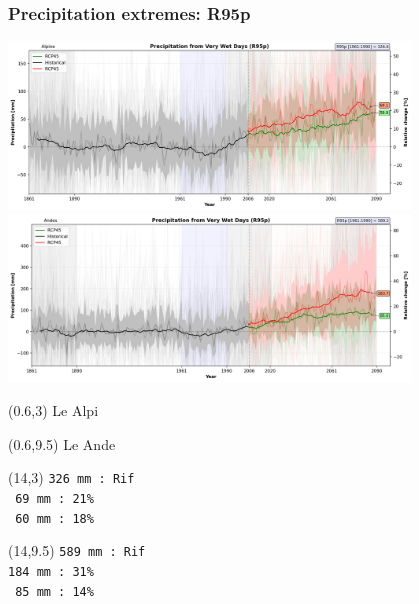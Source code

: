 
\begin{frame}
\frametitle{Precipitation extremes: R95p}
\begin{center}

{\includegraphics[width=0.8\textwidth]{risultati/r95p_Alpine_Models_ts}}
{\includegraphics[width=0.8\textwidth]{risultati/r95p_Andes_Models_ts}}
\end{center}

{
  \scriptsize
  \begin{textblock}{1.8}(0.6,3)
     {\color{gray} Le Alpi}
  \end{textblock}
}


{
  \scriptsize
  \begin{textblock}{1.8}(0.6,9.5)
     {\color{gray} Le Ande}
  \end{textblock}
}

{ \tiny
  \begin{textblock}{3}(14,3)
     {\color{CadetBlue}   \texttt{326 mm : Rif}} \\
     {\color{red}         \texttt{ 69 mm : 21\% }}\\
     {\color{ForestGreen} \texttt{ 60 mm : 18\% }}
  \end{textblock}
}

{ \tiny
  \begin{textblock}{3}(14,9.5)
     {\color{CadetBlue}   \texttt{589 mm : Rif}} \\
     {\color{red}         \texttt{184 mm : 31\% }} \\
     {\color{ForestGreen} \texttt{ 85 mm : 14\%  }}
  \end{textblock}
}

\end{frame}

